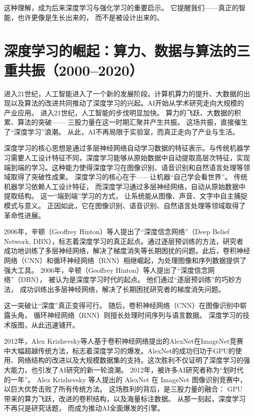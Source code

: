 这种理解，成为后来深度学习与强化学习的重要启示。  
它提醒我们——真正的智能，也许更像是生长出来的，  
而不是被设计出来的。  

\section{深度学习的崛起：算力、数据与算法的三重共振（2000–2020）}

进入21世纪，人工智能进入了一个新的发展阶段。计算机算力的提升、大数据的出现以及算法的改进共同推动了深度学习的兴起。AI开始从学术研究走向大规模的产业应用。
进入21世纪，人工智能的步伐明显加快。  
算力的飞跃、大数据的积累、算法的突破——  
三股力量在这一时期汇聚并产生共振。  
这场共振，直接催生了“深度学习”浪潮。  
从此，AI不再局限于实验室，而真正走向了产业与生活。  

深度学习的核心思想是通过多层神经网络自动学习数据的特征表示。与传统机器学习需要人工设计特征不同，深度学习能够从原始数据中自动提取高层次特征，实现端到端的学习。这种能力使得深度学习在图像识别、语音识别和自然语言处理等领域取得了突破性成果。
深度学习的核心在于——让机器“自己学会看世界”。  
传统机器学习依赖人工设计特征，  
而深度学习通过多层神经网络，自动从原始数据中提取结构。  
这一“端到端”学习的方式，  
让系统能从图像、声音、文字中自主捕捉模式与意义。  
正因如此，它在图像识别、语音识别、自然语言处理等领域取得了革命性进展。  

2006年，辛顿（Geoffrey Hinton）等人提出了“深度信念网络”（Deep Belief Network, DBN），标志着深度学习的真正起点。通过逐层预训练的方法，研究者成功地训练了多层神经网络，解决了梯度消失等长期困扰的问题。此后，卷积神经网络（CNN）和循环神经网络（RNN）相继崛起，为处理图像和序列数据提供了强大工具。
2006年，辛顿（Geoffrey Hinton）等人提出了“深度信念网络”（DBN），  
被认为是深度学习时代的起点。  
他们通过“逐层预训练”的巧妙方法，  
成功训练出多层神经网络，解决了长期困扰研究者的梯度消失问题。  

这一突破让“深度”真正变得可行。  
随后，卷积神经网络（CNN）在图像识别中崭露头角，  
循环神经网络（RNN）则擅长处理时间序列与语言数据。  
深度学习的技术版图，从此迅速铺开。  

2012年，Alex Krizhevsky等人基于卷积神经网络提出的AlexNet在ImageNet竞赛中大幅超越传统方法，标志着深度学习的爆发。AlexNet的成功归功于GPU的使用、网络结构的改进以及大规模数据集的支持。这次胜利不仅证明了深度学习的强大能力，也引发了AI研究的新一轮浪潮。
2012年，被许多AI研究者称为“划时代的一年”。  
Alex Krizhevsky 等人提出的 AlexNet 在 ImageNet 图像识别竞赛中，  
以巨大优势击败了所有传统方法。  
这场胜利的背后，是三股力量的融合：  
GPU 带来的算力飞跃，改进的卷积结构，以及海量标注数据。  
从那一刻起，深度学习不再只是研究话题，  
而成为推动AI全面爆发的引擎。  

